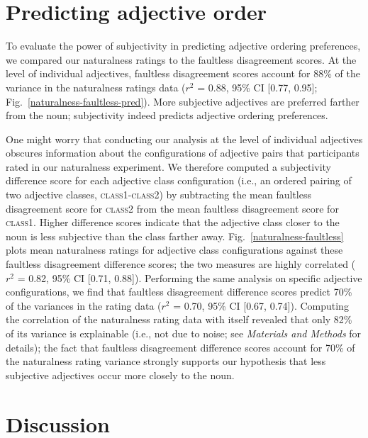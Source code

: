 \documentclass{pnastwo}
\begin{document}
\begin{article}
\section{Predicting adjective order}

To evaluate the power of subjectivity in predicting adjective ordering preferences, we compared our naturalness ratings to the faultless disagreement scores. At the level of individual adjectives, faultless disagreement scores account for 88\% of the variance in the naturalness ratings data ($r^2$ = 0.88, 95\% CI [0.77, 0.95]; Fig.~\ref{naturalness-faultless-pred}). 
More subjective adjectives are preferred farther from the noun; subjectivity indeed predicts adjective ordering preferences.

One might worry that conducting our analysis at the level of individual adjectives obscures information about the configurations of adjective pairs that participants rated in our naturalness experiment.
We therefore computed a subjectivity difference score for each adjective class configuration (i.e., an ordered pairing of two adjective classes, \textsc{class1}-\textsc{class2}) by subtracting the mean faultless disagreement score for \textsc{class2} from the mean faultless disagreement score for \textsc{class1}. Higher difference scores indicate that the adjective class closer to the noun is less subjective than the class farther away. Fig.~\ref{naturalness-faultless} plots mean naturalness ratings for adjective class configurations against these faultless disagreement difference scores; the two measures are highly correlated ($r^2$ = 0.82, 95\% CI [0.71, 0.88]). Performing the same analysis on specific adjective configurations, we find that faultless disagreement difference scores predict 70\% of the variances in the rating data ($r^2$ = 0.70, 95\% CI [0.67, 0.74]). Computing the correlation of the 
naturalness rating data with itself revealed that only 82\% of its variance is explainable (i.e., not due to noise; see \emph{Materials and Methods} for details); the fact that faultless disagreement difference scores account for 70\% of the naturalness rating variance strongly supports our hypothesis that less subjective adjectives occur more closely to the noun. 

\section{Discussion}


\end{article}
\end{document}
